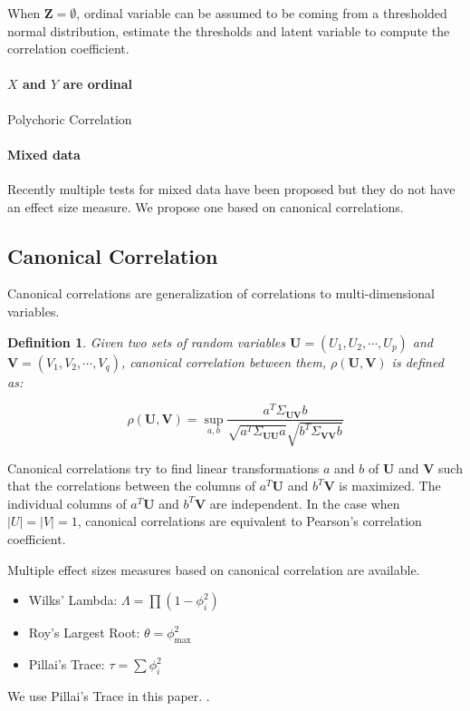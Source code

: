 \documentclass{article}
\newtheorem{definition}{Definition}
\begin{document}
When $ \bm{Z} = \emptyset $, ordinal variable can be assumed to be coming from a thresholded normal distribution, estimate the thresholds and latent variable to compute 
the correlation coefficient.

\paragraph{$ X $ and $ Y $ are ordinal}
Polychoric Correlation

\paragraph{Mixed data}
Recently multiple tests for mixed data have been proposed but they do not have
an effect size measure. We propose one based on canonical correlations.

\subsection{Canonical Correlation}
Canonical correlations are generalization of correlations to multi-dimensional variables.

\begin{definition}
	Given two sets of random variables $ \bm{U} = (U_1, U_2, \cdots, U_p) $
	and $ \bm{V} = (V_1, V_2, \cdots, V_q) $, canonical correlation between
	them, $\rho(\bm{U}, \bm{V}) $ is defined as:
		
	\begin{equation}
		\rho(\bm{U}, \bm{V}) = \sup_{a, b} \frac{a^T \Sigma_{\bm{U}\bm{V}} b}{\sqrt{a^T \Sigma_{\bm{U}\bm{U}} a} \sqrt{b^T \Sigma_{\bm{V}\bm{V}} b}}
	\end{equation}

\end{definition}
	
	Canonical correlations try to find linear transformations $ a $ and $ b
	$ of $ \bm{U} $ and $ \bm{V} $ such that the correlations between the
	columns of $ a^T \bm{U} $ and $ b^T \bm{V} $ is maximized. The
	individual columns of $ a^T \bm{U} $ and $ b^T \bm{V} $ are
	independent. In the case when $ \rvert U \rvert = \rvert V \rvert = 1$,
	canonical correlations are equivalent to Pearson's correlation
	coefficient.

Multiple effect sizes measures based on canonical correlation are available.
\begin{itemize}
	\item Wilks' Lambda: $ \Lambda = \prod (1 - \phi_i^2) $
	\item Roy's Largest Root: $ \theta = \phi_{\max}^2 $
	\item Pillai's Trace: $ \tau = \sum \phi_i^2 $
\end{itemize}
We use Pillai's Trace in this paper. .
\end{document}
